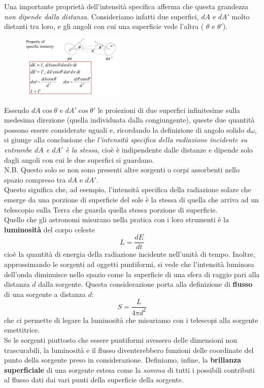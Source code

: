 \documentclass[a4paper,11pt]{article}
\begin{document}
Una importante proprietà dell'intensità specifica afferma che questa grandezza \textit{non dipende dalla distanza}. Consideriamo  infatti due superfici, \(dA\) e \(dA'\) molto distanti tra loro, e gli angoli con cui una superficie vede l'altra ( \(\theta\) e \(\theta'\)). 
\begin{figure}[h!!]
    \centering
    \includegraphics[width=5cm]{WhatsApp Image 2023-01-08 at 10.41.49.jpeg}
    \label{fig:my_label3}
\end{figure}
Essendo \(dA\cos{\theta} \) e \(dA'\cos{\theta'} \) le proiezioni di due superfici infinitesime sulla medesima direzione (quella individuata dalla congiungente), queste due quantità possono essere considerate uguali e, ricordando la definizione di angolo solido \(d\omega\), si giunge alla conclusione che \textit{l'intensità specifica della radiazione incidente su entrambe \(dA\) e \(dA'\) è la stessa}, cioè è indipendente dalle distanze e dipende solo dagli angoli con cui le due superfici si guardano.\\
N.B. Questo solo se non sono presenti altre sorgenti o corpi assorbenti nello spazio compreso tra \(dA\) e \(dA'\).\\

Questo significa che, ad esempio, l'intensità specifica della radiazione solare che emerge da una porzione di superficie del sole è la stessa di quella che arriva ad un telescopio sulla Terra che guarda quella stessa porzione di superficie.\\


Quello che gli astronomi misurano nella pratica con i loro strumenti è la \textbf{luminosità} del corpo celeste 
\begin{equation*}
    L = \frac{dE}{dt}
\end{equation*}
cioè la quantità di energia della radiazione incidente nell'unità di tempo.   
Inoltre, approssimando le sorgenti ad oggetti puntiformi, si vede che l'intensità luminosa dell'onda diminuisce nello spazio come la superficie di una sfera di raggio pari alla distanza \(d\) dalla sorgente. Questa considerazione porta alla definizione di \textbf{flusso} di una sorgente a distanza \(d\): 
\begin{equation*}
    S = \frac{L}{4\pi d^2}
\end{equation*}
che ci permette di legare la luminosità che misuriamo con i telescopi alla sorgente emettitrice.\\
Se le sorgenti piuttosto che essere puntiformi avessero delle dimensioni non trascurabili, la luminosità e il flusso diventerebbero funzioni delle coordinate del punto della sorgente preso in considerazione. Definiamo, infine, la \textbf{brillanza superficiale} di una sorgente estesa come la \textit{somma} di tutti i possibili contributi al flusso dati dai vari punti della superficie della sorgente. 
\end{document}
